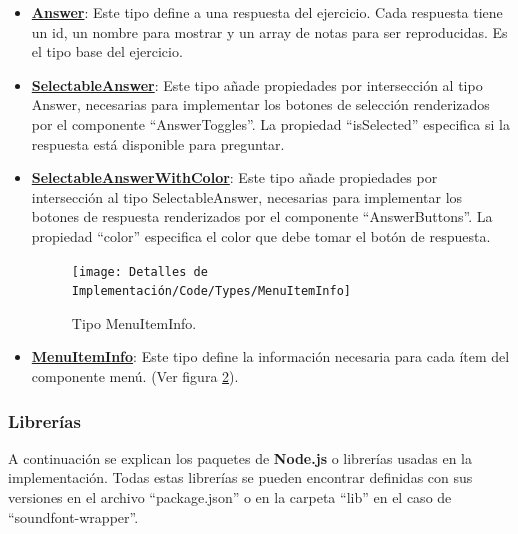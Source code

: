 \documentclass[12pt,twoside,titlepage]{report}
\begin{document}
\begin{itemize}
    \begin{figure}[H]
        \centering
        \texttt{[image: Detalles de Implementación/Code/Types/Answer]}
        \caption{Tipo Answer.}
        \label{fig:Answer}
    \end{figure}

    Cada variante de ejercicio utiliza los tipos Answer, SelectableAnswer y SelectableAnswerWithColor. (Ver figura \ref{fig:Answer}).

    \item \href{https://github.com/alberttogoca/EarFit/blob/main/src/types/index.ts}{\textbf{Answer}}: Este tipo define a una respuesta del ejercicio. Cada respuesta tiene un id, un nombre para mostrar y un array de notas para ser reproducidas. Es el tipo base del ejercicio.
    \item \href{https://github.com/alberttogoca/EarFit/blob/main/src/types/index.ts}{\textbf{SelectableAnswer}}: Este tipo añade propiedades por intersección al tipo Answer, necesarias para implementar los botones de selección renderizados por el componente ``AnswerToggles''. La propiedad ``isSelected'' especifica si la respuesta está disponible para preguntar.
    \item \href{https://github.com/alberttogoca/EarFit/blob/main/src/types/index.ts}{\textbf{SelectableAnswerWithColor}}: Este tipo añade propiedades por intersección al tipo SelectableAnswer, necesarias para implementar los botones de respuesta renderizados por el componente ``AnswerButtons''. La propiedad ``color'' especifica el color que debe tomar el botón de respuesta.

    \begin{figure}[H]
        \centering
        \texttt{[image: Detalles de Implementación/Code/Types/MenuItemInfo]}
        \caption{Tipo MenuItemInfo.}
        \label{fig:MenuItemInfo}
    \end{figure}

    \item \href{https://github.com/alberttogoca/EarFit/blob/main/src/types/index.ts}{\textbf{MenuItemInfo}}: Este tipo define la información necesaria para cada ítem del componente menú. (Ver figura \ref{fig:MenuItemInfo}).
\end{itemize}

\subsubsection{Librerías}
\label{sec:lib}

A continuación se explican los paquetes de \textbf{Node.js} o librerías usadas en la implementación. Todas estas librerías se pueden encontrar definidas con sus versiones en el archivo ``package.json'' o en la carpeta ``lib'' en el caso de ``soundfont-wrapper''.
\end{document}
